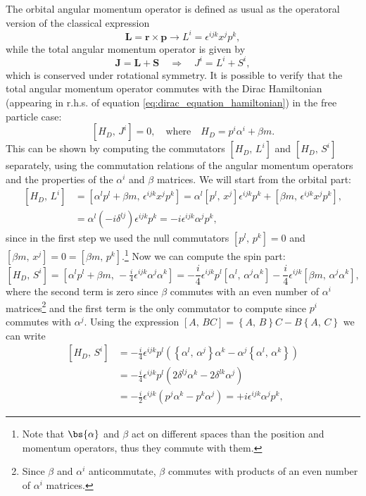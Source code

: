 The orbital angular momentum operator is defined as usual as the operatoral version of the classical expression
\[
    \mathbf{L} = \mathbf{r}\times \mathbf{p} \longrightarrow L^i = \epsilon^{ijk} x^j p^k,
\]
while the total angular momentum operator is given by
\[
    \mathbf{J} = \mathbf{L} + \mathbf{S} \quad \Longrightarrow \quad J^i = L^i + S^i,
\]
which is conserved under rotational symmetry. It is possible to verify that the total angular momentum operator commutes with the Dirac Hamiltonian (appearing in r.h.s. of equation \eqref{eq:dirac_equation_hamiltonian}) in the free particle case:
\[
    \left[H_D,\, J^i\right] = 0, \quad \text{where} \quad H_D = p^i \alpha^i + \beta m.
\]
This can be shown by computing the commutators \(\left[H_D,\, L^i\right]\) and \(\left[H_D,\, S^i\right]\) separately, using the commutation relations of the angular momentum operators and the properties of the \(\alpha^i\) and \(\beta\) matrices. We will start from the orbital part:
\[
    \begin{aligned}
        \left[H_D,\, L^i\right] & = \left[\alpha^l p^l + \beta m,\, \epsilon^{ijk} x^j p^k\right] = \alpha^l \left[p^l,\, x^j \right] \epsilon^{ijk} p^k + \left[\beta m,\, \epsilon^{ijk} x^j p^k\right], \\
                                & = \alpha^l \left(-i \delta^{lj}\right) \epsilon^{ijk} p^k = -i \epsilon^{ijk} \alpha^j p^k,
    \end{aligned}
\]
since in the first step we used the null commutators \(\left[p^l,\, p^k\right] = 0\) and \(\left[\beta m,\, x^j\right] = 0 = \left[\beta m,\, p^k\right]\).\footnote{Note that \(\bs{\alpha}\) and \(\beta\) act on different spaces than the position and momentum operators, thus they commute with them.} Now we can compute the spin part:
\[
    \left[H_D,\, S^i\right] = \left[\alpha^l p^l + \beta m,\, -\tfrac{i}{4} \epsilon^{ijk} \alpha^j \alpha^k\right] = - \frac{i}{4} \epsilon^{ijk} p^l \left[\alpha^l,\, \alpha^j \alpha^k\right] - \frac{i}{4} \epsilon^{ijk} \left[\beta m,\, \alpha^j \alpha^k\right],
\]
where the second term is zero since \(\beta\) commutes with an even number of \(\alpha^i\) matrices\footnote{Since \(\beta\) and \(\alpha^i\) anticommutate, \(\beta\) commutes with products of an even number of \(\alpha^i\) matrices.} and the first term is the only commutator to compute since \(p^i\) commutes with \(\alpha^j\). Using the expression \(\left[A,\,BC\right] = \left\{A,\,B\right\}C - B\left\{A,\,C\right\}\) we can write
\[
    \begin{aligned}
        \left[H_D,\, S^i\right] & = - \frac{i}{4} \epsilon^{ijk} p^l \left( \left\{\alpha^l,\,\alpha^j\right\}\alpha^k - \alpha^j \left\{\alpha^l,\, \alpha^k\right\} \right) \\
                                & = - \frac{i}{4} \epsilon^{ijk} p^l \left( 2 \delta^{lj} \alpha^k - 2 \delta^{lk} \alpha^j \right)                                           \\
                                & = - \frac{i}{2} \epsilon^{ijk} \left(p^j \alpha^k - p^k \alpha^j\right) = + i \epsilon^{ijk} \alpha^j p^k,
    \end{aligned}
\]
